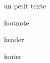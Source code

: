 \documentclass[11pt,a4paper]{article}
\begin{document}
un petit texte

footnote

header

footer
\end{document}

